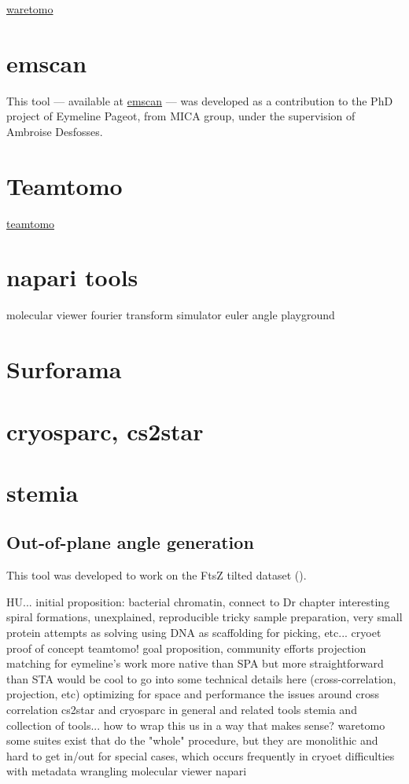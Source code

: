 \href{https://gihub.com/brisvag/waretomo}{waretomo}

\section{emscan}

This tool --- available at \href{https://gihub.com/brisvag/emscan}{emscan} --- was developed as a contribution to the PhD project of Eymeline Pageot, from MICA group, under the supervision of Ambroise Desfosses.


\section{Teamtomo}

\href{https://teamtomo.org}{teamtomo}
\section{napari tools}
molecular viewer
fourier transform simulator
euler angle playground

\section{Surforama}

\section{cryosparc, cs2star}

\section{stemia}

\subsection{Out-of-plane angle generation}\label{stemia_angles}
This tool was developed to work on the FtsZ tilted dataset ().

\begin{outline}
\1 HU...
    \2 initial proposition: bacterial chromatin, connect to Dr chapter
    \2 interesting spiral formations, unexplained, reproducible
    \2 tricky sample preparation, very small protein
        \3 attempts as solving using DNA as scaffolding for picking, etc...
        \3 cryoet proof of concept
\1 teamtomo!
    \2 goal proposition, community efforts
\1 projection matching for eymeline's work
    \2 more native than SPA but more straightforward than STA
    \2 would be cool to go into some technical details here (cross-correlation, projection, etc)
    \2 optimizing for space and performance
    \2 the issues around cross correlation
\1 cs2star and cryosparc in general and related tools
\1 stemia and collection of tools... how to wrap this us in a way that makes sense?
\1 waretomo
    \2 some suites exist that do the "whole" procedure, but they are monolithic and hard to get in/out for special cases, which occurs frequently in cryoet
    \2 difficulties with metadata wrangling
\1 molecular viewer napari
\end{outline}
